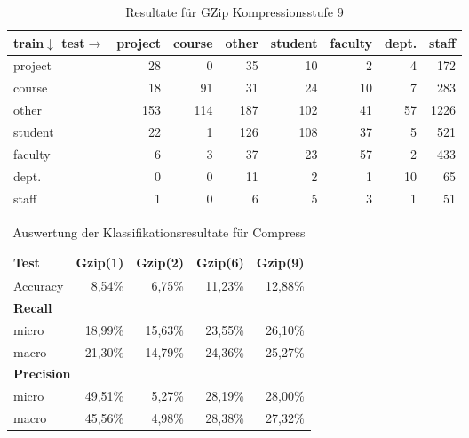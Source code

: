 \begin{frame}[c]
\begin{itemize}
  \begin{table}[htbp]
\caption{Resultate für GZip Kompressionsstufe 9}
\begin{tabular}{|l|r|r|r|r|r|r|r|}
\hline
train$\downarrow$ test$\rightarrow$& \multicolumn{1}{l|}{project} & \multicolumn{1}{l|}{course} &
\multicolumn{1}{l|}{other} & \multicolumn{1}{l|}{student} &
\multicolumn{1}{l|}{faculty} & \multicolumn{1}{l|}{dept.} &
\multicolumn{1}{l|}{staff} \\ \hline project & 28 & 0 & 35 & 10 & 2 & 4 & 172 \\ \hline course & 18 & 91 & 31 & 24 & 10 & 7 & 283 \\ \hline other & 153 & 114 & 187 & 102 & 41 & 57 & 1226 \\ \hline
student & 22 & 1 & 126 & 108 & 37 & 5 & 521 \\ \hline
faculty & 6 & 3 & 37 & 23 & 57 & 2 & 433 \\ \hline
dept. & 0 & 0 & 11 & 2 & 1 & 10 & 65 \\ \hline
staff & 1 & 0 & 6 & 5 & 3 & 1 & 51 \\ \hline
\end{tabular}
\label{tbl:GzipL9}
\end{table}
   
\end{itemize}
\end{frame}

\begin{frame}[c]
\begin{itemize}
\begin{table}[htbp]
\begin{tabular}{|l|r|r|r|r|}
\hline
\textbf{Test} & \textbf{Gzip(1)} & \textbf{Gzip(2)} &
\textbf{Gzip(6)} & \textbf{Gzip(9)} \\ \hline Accuracy & 8,54\% & 6,75\% & 11,23\% & 12,88\% \\ \hline
\multicolumn{5}{|l|}{\textbf{Recall}}  \\ \hline micro & 18,99\% & 15,63\% &
23,55\% & 26,10\% \\ \hline macro & 21,30\% & 14,79\% & 24,36\% & 25,27\% \\ \hline
\multicolumn{5}{|l|}{\textbf{Precision}}  \\ \hline micro & 49,51\% & 5,27\% &
28,19\% & 28,00\% \\ \hline macro & 45,56\% & 4,98\% & 28,38\% & 27,32\% \\ \hline
\end{tabular}
\caption{Auswertung der Klassifikationsresultate für Compress}
\label{tbl:GzipAccuResults}
\end{table}
  
\end{itemize}
\end{frame}

